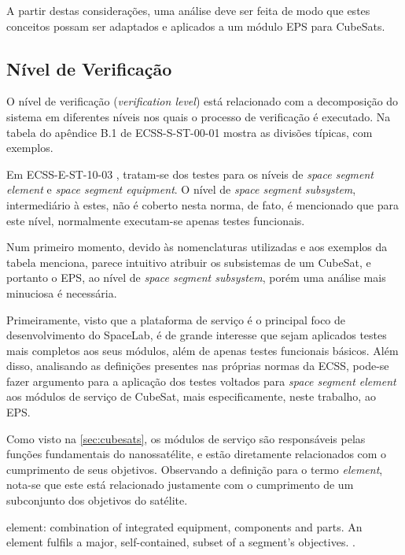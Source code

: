 A partir destas considerações, uma análise deve ser feita de modo que estes conceitos possam ser adaptados e aplicados a um módulo \gls{EPS} para CubeSats.


\subsection{Nível de Verificação} \label{sec:nivel-verificacao}


O nível de verificação (\textit{verification level}) está relacionado com a decomposição do sistema em diferentes níveis nos quais o processo de verificação é executado.
Na tabela do apêndice B.1 de ECSS-S-ST-00-01 \cite{ecss-s-st-00-01} mostra as divisões típicas, com exemplos.

Em ECSS-E-ST-10-03 \cite{ecss-e-st-10-03}, tratam-se dos testes para os níveis de \textit{space segment element} e \textit{space segment equipment}. O nível de \textit{space segment subsystem}, intermediário à estes, não é coberto nesta norma, de fato, é mencionado que para este nível, normalmente executam-se apenas testes funcionais.

Num primeiro momento, devido às nomenclaturas utilizadas e aos exemplos da tabela menciona, parece intuitivo atribuir os subsistemas de um CubeSat, e portanto o \gls{EPS}, ao nível de \textit{space segment subsystem}, porém uma análise mais minuciosa é necessária.

Primeiramente, visto que a plataforma de serviço é o principal foco de desenvolvimento do SpaceLab, é de grande interesse que sejam aplicados testes mais completos aos seus módulos, além de apenas testes funcionais básicos.
Além disso, analisando as definições presentes nas próprias normas da \gls{ECSS}, pode-se fazer argumento para a aplicação dos testes voltados para \textit{space segment element} aos módulos de serviço de CubeSat, mais especificamente, neste trabalho, ao \gls{EPS}.

Como visto na \autoref{sec:cubesats}, os módulos de serviço são responsáveis pelas funções fundamentais do nanossatélite, e estão diretamente relacionados com o cumprimento de seus objetivos.
Observando a definição para o termo \textit{element}, nota-se que este está relacionado justamente com o cumprimento de um subconjunto dos objetivos do satélite.

\begin{citacao}
    element: combination of integrated equipment, components and parts. An element fulfils a major, self-contained, subset of a segment's objectives. \cite[p. 9]{ecss-s-st-00-01}.
\end{citacao}

